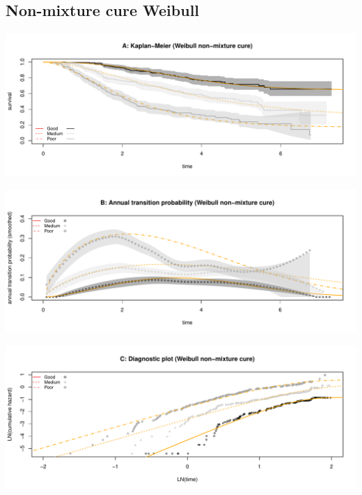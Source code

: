 \documentclass[]{article}
\begin{document}
\subsection{Non-mixture cure Weibull}\label{non-mixture-cure-weibull}

\begin{flushleft}\includegraphics[height=0.25\textheight]{Images/cure_weib_nmix-1} \end{flushleft}

\begin{flushleft}\includegraphics[height=0.25\textheight]{Images/cure_weib_nmix-2} \end{flushleft}

\begin{flushleft}\includegraphics[height=0.25\textheight]{Images/cure_weib_nmix-3} \end{flushleft}

\newpage
\end{document}
